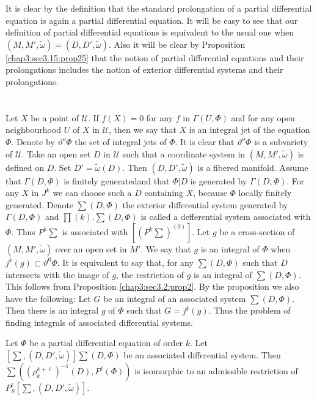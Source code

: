 It is clear by the definition that the standard prolongation of a
partial differential equation is again a partial differential
equation. It will be easy to see that our definition of partial
differential equations is equivalent to the usual one when
$(M,M',\tilde{\omega})=(D,D', \tilde{\omega})$. Also it will be
clear by Proposition \ref{chap3:sec3.15:prop25} that the notion of partial differential
equations and their prolongations includes the notion of exterior
differential systems and their prolongations.  

\section{}\label{chap3:sec3.16}%

Let $X$ be a point of $\mathscr{U}$. If $f(X)=0$ for any $f$ in
$\Gamma (U, \Phi)$ and for any open neighbourhood $U$ of $X$ in
$\mathscr{U}$, then we say that $X$ is an integral jet of the equation
$\Phi$. Denote by $\vartheta^o \Phi$ the set of integral jets of $\Phi$. It
is clear that $\vartheta^{o}\Phi$ is a subvariety of $\mathscr{U}$. Take an
open set $D$ in $\mathscr{U}$ such that a coordinate system in $(M,M',
\tilde{\omega})$ is defined on $D$. Set $D' =\tilde{\omega} (D)$. Then
$(D,D', \tilde{\omega})$ is a fibered manifold. Assume that $\Gamma (D,
\Phi)$ is finitely generated\pageoriginale and that $\Phi | D$ is generated by
$\Gamma (D, \Phi)$. For any $X$ in $J^k$ we can choose such a $D$
containing $X$, because $\Phi$ locally finitely generated. Denote
$\sum (D, \Phi)$ the exterior differential system generated by $\Gamma
(D, \Phi)$ and $\prod (k). \sum (D,\Phi)$ is called a defferential
system associated with $\Phi$. Thus $P^k\sum$ is associated with
$\left[(P^k \sum)^{(0)}\right]$. Let $g$ be a cross-section of
$(M,M', \tilde{\omega})$ over an open set in $M'$. We say that $g$ is an
integral of $\Phi$ when $j^k(g)\subset \vartheta^{0} \Phi$. It is
equivalent to say that, for any $\sum(D,\Phi)$ such that $D$
intersects with the image of $g$, the restriction of $g$ is an
integral of $\sum(D, \Phi)$. This follows from Proposition
\ref{chap3:sec3.2:prop2}. By the
proposition we also have the following: Let $G$ be an integral of an
associated system $\sum(D,\Phi)$. Then there is an integral $g$ of
$\Phi$ such that $G=j^k(g)$. Thus the problem of finding integrals of
associated differential systems.  

\begin{proposition}\label{chap3:sec3.16:prop26}%
  Let $\Phi$ be a partial differential equation of order $k$. Let
  $\left[\sum, (D, D', \tilde{\omega})\right]\sum(D,\Phi)$ be an
  associated differential system. Then $\sum((\rho^{k+\ell}_{k} )^{-1}
  (D), P^\ell (\Phi))$ is isomorphic to an admissible restriction of
  \break $P^\ell_S \left[\sum, (D,D',\tilde{\omega})\right]$. 
\end{proposition}

